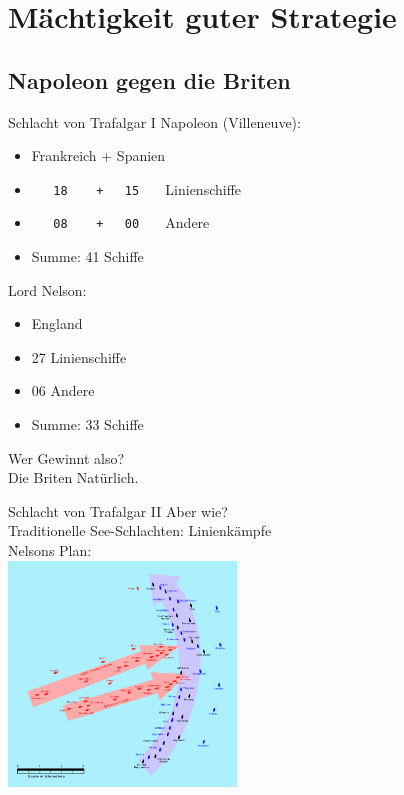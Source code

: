 \section{Mächtigkeit guter Strategie}

\subsection{Napoleon gegen die Briten}

\begin{frame}[c, fragile]{Schlacht von Trafalgar I}
    Napoleon (Villeneuve):
    \begin{itemize}
        \item Frankreich + Spanien
        \item<2-> \verb!   18    +   15   ! Linienschiffe
        \item<2-> \verb!   08    +   00   ! Andere
        \item<3-> Summe: 41 Schiffe
    \end{itemize}

    Lord Nelson:
    \begin{itemize}
        \item England
        \item<2-> 27 Linienschiffe
        \item<2-> 06 Andere
        \item<3-> Summe: 33 Schiffe
    \end{itemize}
    \pause
    \pause
    \pause

    Wer Gewinnt also? \\
    \ifonline Die Briten Natürlich. \fi
\end{frame}


\begin{frame}{Schlacht von Trafalgar II}
    Aber wie? \\
    \pause
    Traditionelle See-Schlachten: Linienkämpfe \\
    \pause
    Nelsons Plan: \\
    \includegraphics[height=6cm]{strategy/Trafalgar-1200hr.jpg}
\end{frame}

